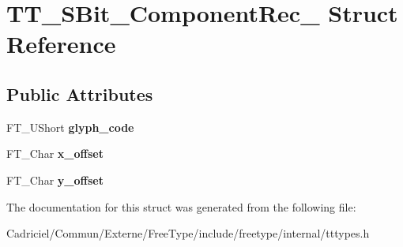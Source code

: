 \hypertarget{struct_t_t___s_bit___component_rec__}{\section{T\-T\-\_\-\-S\-Bit\-\_\-\-Component\-Rec\-\_\- Struct Reference}
\label{struct_t_t___s_bit___component_rec__}
}
\subsection*{Public Attributes}
\begin{DoxyCompactItemize}
\item 
\hypertarget{struct_t_t___s_bit___component_rec___a357eef9c05c65034b506cdd48271e562}{F\-T\-\_\-\-U\-Short {\bfseries glyph\-\_\-code}}\label{struct_t_t___s_bit___component_rec___a357eef9c05c65034b506cdd48271e562}

\item 
\hypertarget{struct_t_t___s_bit___component_rec___a97799704aa59bf737e274289fa70ca3f}{F\-T\-\_\-\-Char {\bfseries x\-\_\-offset}}\label{struct_t_t___s_bit___component_rec___a97799704aa59bf737e274289fa70ca3f}

\item 
\hypertarget{struct_t_t___s_bit___component_rec___af24f91b7d5e0268a223514ad68a9a10b}{F\-T\-\_\-\-Char {\bfseries y\-\_\-offset}}\label{struct_t_t___s_bit___component_rec___af24f91b7d5e0268a223514ad68a9a10b}

\end{DoxyCompactItemize}


The documentation for this struct was generated from the following file\-:\begin{DoxyCompactItemize}
\item 
Cadriciel/\-Commun/\-Externe/\-Free\-Type/include/freetype/internal/tttypes.\-h\end{DoxyCompactItemize}
